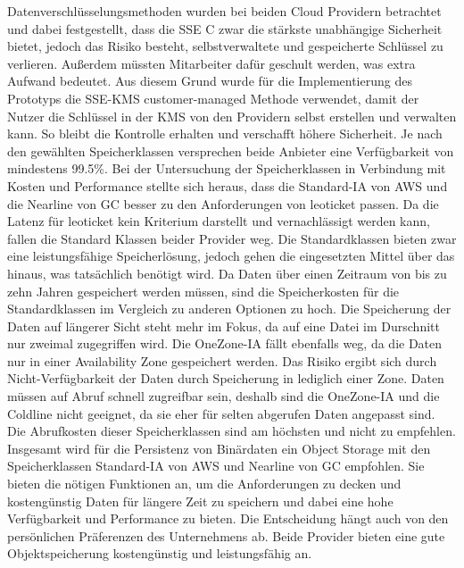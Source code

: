  Datenverschlüsselungsmethoden wurden bei beiden Cloud Providern betrachtet und dabei festgestellt, dass die SSE C zwar die stärkste unabhängige Sicherheit bietet, jedoch das Risiko besteht, selbstverwaltete und gespeicherte Schlüssel zu verlieren. Außerdem müssten Mitarbeiter dafür geschult werden, was extra Aufwand bedeutet. Aus diesem Grund wurde für die Implementierung des Prototyps die SSE-KMS customer-managed Methode verwendet, damit der Nutzer die Schlüssel in der KMS von den Providern selbst erstellen und verwalten kann. So bleibt die Kontrolle erhalten und verschafft höhere Sicherheit. Je nach den gewählten Speicherklassen versprechen beide Anbieter eine Verfügbarkeit von mindestens 99.5\%. Bei der Untersuchung der Speicherklassen in Verbindung mit Kosten und Performance stellte sich heraus, dass die Standard-IA von AWS und die Nearline von GC besser zu den Anforderungen von leoticket passen. Da die Latenz für leoticket kein Kriterium darstellt und vernachlässigt werden kann, fallen die Standard Klassen beider Provider weg. Die Standardklassen bieten zwar eine leistungsfähige Speicherlösung, jedoch gehen die eingesetzten Mittel über das hinaus, was tatsächlich benötigt wird. Da Daten über einen Zeitraum von bis zu zehn Jahren gespeichert werden müssen, sind die Speicherkosten für die Standardklassen im Vergleich zu anderen Optionen zu hoch. Die Speicherung der Daten auf längerer Sicht steht mehr im Fokus, da auf eine Datei im Durschnitt nur zweimal zugegriffen wird. Die OneZone-IA fällt ebenfalls weg, da die Daten nur in einer Availability Zone gespeichert werden. Das Risiko ergibt sich durch Nicht-Verfügbarkeit der Daten durch Speicherung in lediglich einer Zone. Daten müssen auf Abruf schnell zugreifbar sein, deshalb sind die OneZone-IA und die Coldline nicht geeignet, da sie eher für selten abgerufen Daten angepasst sind. Die Abrufkosten dieser Speicherklassen sind am höchsten und nicht zu empfehlen.\\

Insgesamt wird für die Persistenz von Binärdaten ein Object Storage mit den Speicherklassen Standard-IA von AWS und Nearline von GC empfohlen. Sie bieten die nötigen Funktionen an, um die Anforderungen zu decken und kostengünstig Daten für längere Zeit zu speichern und dabei eine hohe Verfügbarkeit und Performance zu bieten. Die Entscheidung hängt auch von den persönlichen Präferenzen des Unternehmens ab. Beide Provider bieten eine gute Objektspeicherung kostengünstig und leistungsfähig an.\\

